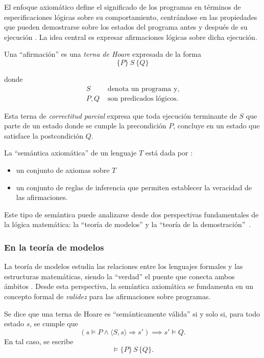 El enfoque axiomático define el significado de los programas en términos de especificaciones lógicas sobre su comportamiento, centrándose en las propiedades que pueden demostrarse sobre los estados del programa antes y después de su ejecución \cite{cornell2014lecture09}. La idea central es expresar afirmaciones lógicas sobre dicha ejecución. 


Una \enquote{afirmación} es una \textit{terna de Hoare} expresada de la forma
\[\{P\}\ S\ \{Q\}\]

donde 
\[
\begin{aligned}
S &\text{ denota un programa y}, \\
P, Q &\text{ son predicados lógicos.}
\end{aligned}
\]

Esta terna de \emph{correctitud parcial} expresa que toda ejecución terminante de \(S\) que parte de un estado donde se cumple la precondición \(P\), concluye en un estado que satisface la postcondición \(Q\).  

La \enquote{semántica axiomática} de un lenguaje $T$ está dada por \cite{aldrich2018hoarelogic}: 

\begin{itemize}
    \item un conjunto de axiomas sobre $T$
    \item un conjunto de reglas de inferencia que permiten establecer la veracidad de las afirmaciones. 
\end{itemize}


Este tipo de semántica puede analizarse desde dos perspectivas fundamentales de la lógica matemática: la \enquote{teoría de modelos} y la \enquote{teoría de la demostración}~\cite{Pierce:SF2}.

\subsubsection{En la teoría de modelos}

La teoría de modelos estudia las relaciones entre los lenguajes formales y las estructuras matemáticas, siendo la \enquote{verdad} el puente que conecta ambos ámbitos \cite{Manzano1989}. Desde esta perspectiva, la semántica axiomática se fundamenta en un concepto formal de \emph{validez} para las afirmaciones sobre programas.

Se dice que una terna de Hoare es \enquote{semánticamente válida} si y solo si, para todo estado $s$, se cumple que~\cite{nielson1992semantics}
\[
(s \vDash P \land \langle S,s\rangle \Rightarrow s') \implies s' \vDash Q.
\]
En tal caso, se escribe
\[
\vDash \{P\}\,S\,\{Q\}.\]

